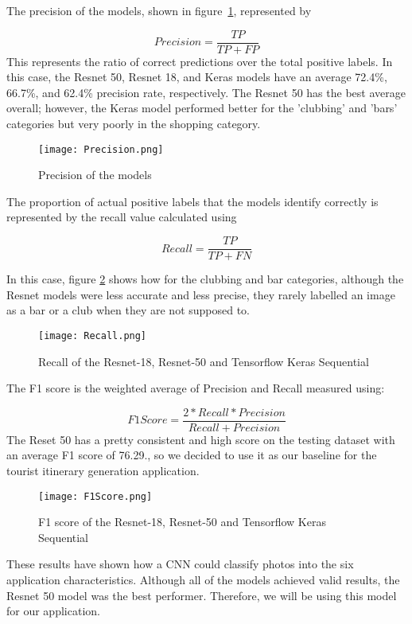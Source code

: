 The precision of the models, shown in figure~\ref{precision}, represented by

\[Precision = \frac{TP}{TP+FP} \]
This represents the ratio of correct predictions over the total positive labels.
In this case, the Resnet 50, Resnet 18, and Keras models have an average 72.4\%, 66.7\%,
and 62.4\% precision rate, respectively. The Resnet 50 has the best average
overall; however, the Keras model performed better for the 'clubbing' and
'bars' categories but very poorly in the shopping category.

\begin{figure}[h]
\centering
\texttt{[image: Precision.png]}
\caption{Precision of the models}
\label{precision}
\end{figure}

The proportion of actual positive labels that the models identify correctly is
represented by the recall value calculated using 

\[Recall= \frac{TP}{TP+FN} \]

In this case, figure \ref{recall}
shows how for the clubbing and bar categories, although the Resnet models were
less accurate and less precise, they rarely labelled an image as a bar or a
club when they are not supposed to.

\begin{figure}[h]
\centering
\texttt{[image: Recall.png]}
\caption{Recall of the Resnet-18, Resnet-50 and Tensorflow Keras Sequential}
\label{recall}
\end{figure}

The F1 score is the weighted average of Precision and Recall measured using:

\[F1 Score = \frac{2*Recall*Precision}{Recall+Precision}  \]
The Reset 50 has a pretty consistent and high score on
the testing dataset with an average F1 score of 76.29., so
we decided to use it as our baseline for the tourist
itinerary generation application.

\begin{figure}[h]
\centering
\texttt{[image: F1Score.png]}
\caption{F1 score of the Resnet-18, Resnet-50 and Tensorflow Keras Sequential}
\label{f1}
\end{figure}

These results have shown how a CNN could classify photos into the six
application characteristics. Although all of the models achieved valid results,
the Resnet 50 model was the best performer. Therefore, we will be using this
model for our application.
